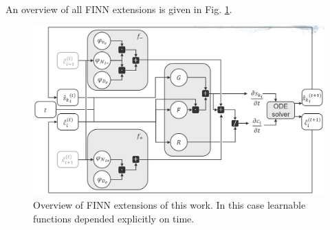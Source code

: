 \\
An overview of all FINN extensions is given in Fig. \ref{fig:ovembedding}. 
\begin{figure}[h!]
    \centering
    \includegraphics[width=\textwidth]{images/ov_embedding.png}
    \caption[Overview of FINN extensions]{Overview of FINN extensions of this work. In this case learnable functions depended explicitly on time.}
    \label{fig:ovembedding}
\end{figure}
\FloatBarrier
